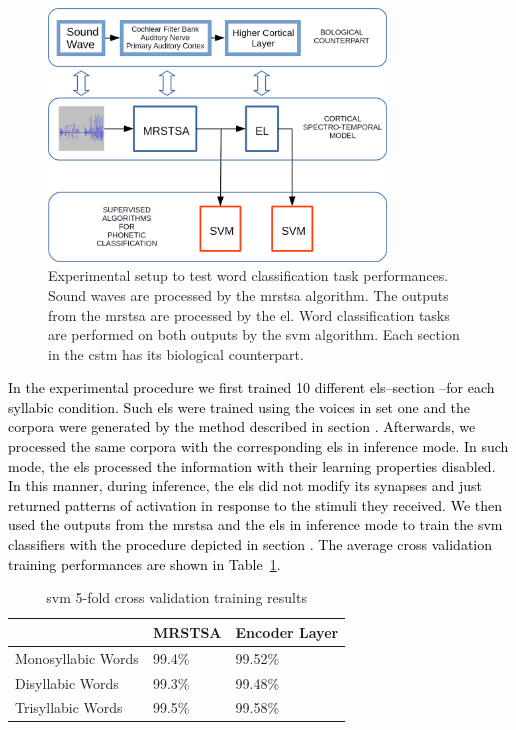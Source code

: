 \documentclass[10pt,letterpaper]{article}
\newcommand{\reviewerfour}[1]{\textcolor{black}{#1}}
\begin{document}
\begin{figure}[h!]
    \centering
    \includegraphics[width=0.8\textwidth]{Experiment.png}
    \caption{Experimental setup to test word classification task performances.
    Sound waves are processed by the \gls{mrstsa} algorithm.
    The outputs from the \gls{mrstsa} are processed by the \gls{el}.
    Word classification tasks are performed on both outputs by the \gls{svm} algorithm.
    Each section in the \gls{cstm} has its biological counterpart.}
    \label{fig:Experiment}
\end{figure}

\pagebreak

\reviewerfour{In the experimental procedure we first trained 10 different \glspl{el}--section \nameref{model-implementation}--for each syllabic condition. Such \glspl{el} were trained using the voices in set one and the corpora were generated by the method described in section \nameref{CorpGen}. Afterwards, we processed the same corpora with the corresponding \glspl{el} in inference mode. In such mode, the \glspl{el} processed the information with their learning properties disabled. In this manner, during inference, the \glspl{el} did not modify its synapses and just returned patterns of activation in response to the stimuli they received. We then used the outputs from the \gls{mrstsa} and the \glspl{el} in inference mode to train the \gls{svm} classifiers with the procedure depicted in section \nameref{model-implementation}. The average cross validation training performances are shown in Table~\ref{SVM_Training}}.

\begin{table}[h!]
\centering
\caption{\gls{svm} 5-fold cross validation training results}
\begin{tabular}{|l|l|l|}
\hline
                   & MRSTSA & Encoder Layer \\ \hline
Monosyllabic Words & 99.4\% & 99.52\%          \\ \hline
Disyllabic Words   & 99.3\%   & 99.48\%        \\ \hline
Trisyllabic Words  & 99.5\% & 99.58\%          \\ \hline
\end{tabular}
\label{SVM_Training}
\end{table}
\end{document}
